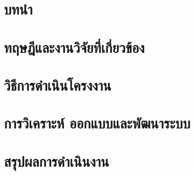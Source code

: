 \documentclass{cskkuproject}
\begin{document}
\makefinalcover
\makefinalcover

\setcounter{page}{0}
\renewcommand{\thepage}{\ThaiAlph{\value{page}}}

\begin{abstractTH}

\end{abstractTH}

\begin{abstractEN}

\end{abstractEN}

\begin{acknowledgement}

\end{acknowledgement}

\tableofcontents
\clearpage
\listoffigures
\clearpage
\listoftables
\clearpage

\setcounter{page}{1}

\chapter{บทนำ}

\chapter{ทฤษฎีและงานวิจัยที่เกี่ยวข้อง}

\chapter{วิธีการดำเนินโครงงาน}

\chapter{การวิเคราะห์ ออกแบบและพัฒนาระบบ}

\chapter{สรุปผลการดำเนินงาน}


\clearpage
{}
\makeatletter
\let\ps@plain\ps@empty
\makeatother





\begin{biography}

\end{biography}
\end{document}
